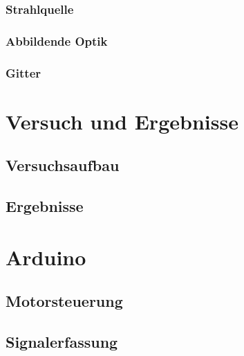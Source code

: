 \documentclass{article}
\begin{document}
\subsubsection{Strahlquelle}


\subsubsection{Abbildende Optik}


\subsubsection{Gitter}


\section{Versuch und Ergebnisse}


\subsection{Versuchsaufbau}


\subsection{Ergebnisse}


\section{Arduino} %

\subsection{Motorsteuerung}

\subsection{Signalerfassung}
\end{document}
